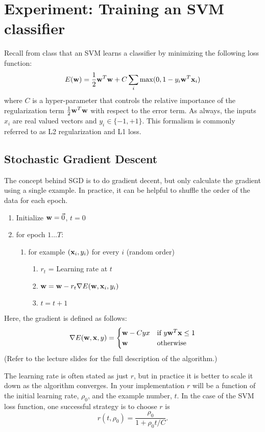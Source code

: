 \section{Experiment: Training an SVM classifier}
\label{sec:experiments}

Recall from class that an SVM learns a classifier by minimizing the
following loss function:
%
$$ E({\bf w}) = \frac{1}{2}{\bf w}^T{\bf w} + C \sum_i \max (0, 1-y_i {\bf w}^T{\bf x}_i)$$
%
where $C$ is a hyper-parameter that controls the relative importance
of the regularization term $\frac{1}{2}{\bf w}^T{\bf w}$ with respect to the error
term. As always, the inputs $x_i$ are real valued vectors and
$y_i \in \{-1, +1\}$. This formalism is commonly referred to as L2 regularization and L1 loss.

\subsection*{Stochastic Gradient Descent}
The concept behind SGD is to do gradient decent, but only calculate
the gradient using a single example. In practice, it can be helpful to
shuffle the order of the data for each epoch.
%
\begin{enumerate}
\item Initialize ${\bf w} = \vec{0}$, $t = 0$
\item for epoch $1 \ldots T$:
  \begin{enumerate}
    \item for example $({\bf x}_i, y_i)$ for every $i$ (random order)
        \begin{enumerate}
        \item $r_t$ = Learning rate at $t$
        \item ${\bf w} = {\bf w} - r_t \nabla E({\bf w}, {\bf x}_i, y_i)$
        \item $t = t + 1$
        \end{enumerate}
    \end{enumerate}
\end{enumerate}

Here, the gradient is defined as follows:
$$ \nabla E({\bf w}, {\bf x}, y) =
\begin{cases}
	{\bf w} - C y x  & \text{if } y {\bf w}^T {\bf x} \leq 1 \\
	{\bf w} & \text{otherwise}
\end{cases}
$$
(Refer to the lecture slides for the full description of the
algorithm.)

The learning rate is often stated as just $r$, but in practice it is
better to scale it down as the algorithm converges. In your
implementation $r$ will be a function of the initial learning rate,
$\rho_0$, and the example number, $t$. In the case of the SVM loss
function, one successful strategy is  to choose $r$ is
$$ r(t, \rho_0) = \frac{\rho_0}{1 + \rho_0t/C}.$$

